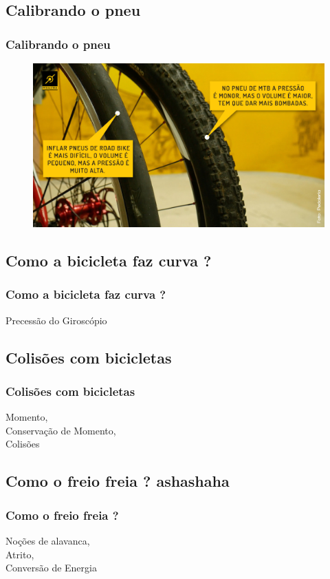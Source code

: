 \documentclass{beamer}
\begin{document}
		\begin{frame}
	\section{Calibrando o pneu}
	\frametitle{Calibrando o pneu}
	\begin{figure}[h]
		\centering
		\includegraphics[scale=0.3]{mtbxspeed.jpg}
	\end{figure}
\end{frame}
	
	\begin{frame}
		\section{Como a bicicleta faz curva ?}
		\frametitle{Como a bicicleta faz curva ?}
		Precessão do Giroscópio
	\end{frame}

	\begin{frame}
		\section{Colisões com bicicletas}
		\frametitle{Colisões com bicicletas}
		Momento, \\
		Conservação de Momento, \\
		Colisões
	\end{frame}

	\begin{frame}
		\section{Como o freio freia ? ashashaha}
		\frametitle{Como o freio freia ?}
		Noções de alavanca, \\
		Atrito, \\
		Conversão de Energia
	\end{frame}
\end{document}
